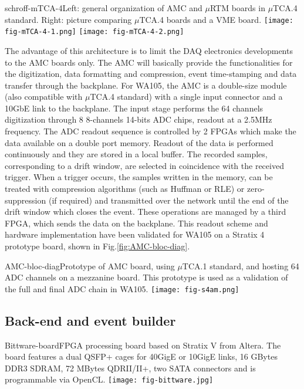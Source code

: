 \begin{cdrfigure}{schroff-mTCA-4}{\small Left: general organization of AMC and $\mu$RTM boards in $\mu$TCA.4 standard. Right: picture comparing $\mu$TCA.4 boards and a VME board.}
\texttt{[image: fig-mTCA-4-1.png]} \hfill
\texttt{[image: fig-mTCA-4-2.png]}
\end{cdrfigure}


The advantage of this architecture is to limit the DAQ electronics developments to the AMC boards only. The AMC will basically provide the functionalities for the digitization, data formatting and compression, event time-stamping and data transfer through the backplane. For WA105, the AMC is a double-size module (also compatible with $\mu$TCA.4 standard) with a single input connector and a 10GbE link to the backplane. The input stage performs the 64 channels digitization through 8 8-channels 14-bits ADC chips, readout at a 2.5MHz frequency. The ADC readout sequence is controlled by 2 FPGAs which make the data available on a double port memory. Readout of the data is performed continuously and they are stored in a local buffer. The recorded samples, corresponding to a drift window, are selected in coincidence with the received trigger. When a trigger occurs, the samples written in the memory, can be treated with compression algorithms (such as Huffman or RLE) or zero-suppression (if required) and transmitted over the network until the end of the drift window which closes the event. These operations are managed by a third FPGA, which sends the data on the backplane.  This readout scheme and hardware implementation have been validated for WA105 on a Stratix 4 prototype board, shown in Fig.\ref{fig:AMC-bloc-diag}.

\begin{cdrfigure}{AMC-bloc-diag}{\small Prototype of AMC board, using $\mu$TCA.1 standard, and hosting 64 ADC channels on a mezzanine board. This prototype is used as a validation of the full and final ADC chain in WA105.}
\texttt{[image: fig-s4am.png]}
\end{cdrfigure}


\subsection{Back-end and event builder}

\begin{cdrfigure}{Bittware-board}{\small FPGA processing board based on Stratix V from Altera. The board features a dual QSFP+ cages for 40GigE or 10GigE links, 16 GBytes DDR3 SDRAM, 72 MBytes QDRII/II+, two SATA connectors and is programmable via OpenCL.}
\texttt{[image: fig-bittware.jpg]}
\end{cdrfigure}

